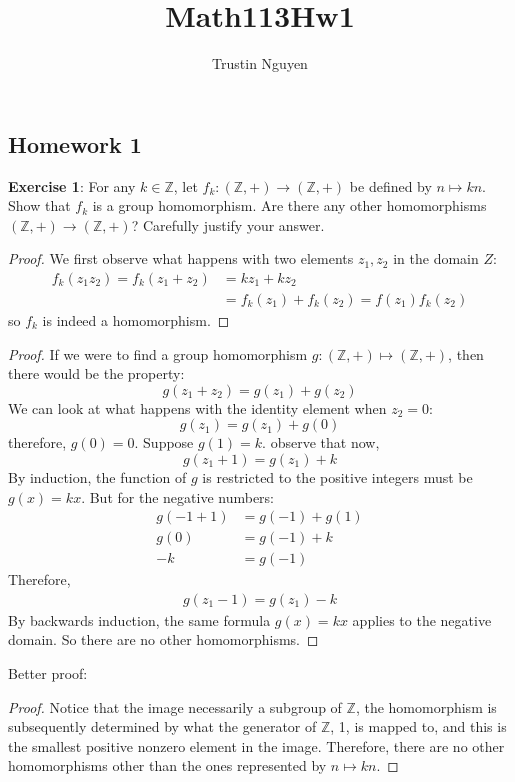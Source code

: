 \documentclass{article}
\title{Math113Hw1}
\author{Trustin Nguyen}
\begin{document}
\maketitle
\begin{topic}
	\section*{Homework 1}
\end{topic}
\reversemarginpar

\textbf{Exercise 1}: For any $k \in \mathbb{Z}$, let $f_{k} : (\mathbb{Z}, + ) \rightarrow (\mathbb{Z}, + )$ be defined by $n \mapsto kn$. Show that $f_{k}$ is a group homomorphism. Are there any other homomorphisms $(\mathbb{Z}, + ) \rightarrow (\mathbb{Z}, + )$? Carefully justify your answer.

\begin{proof}
	We first observe what happens with two elements $z_{1}, z_{2}$ in the domain $Z$:
	\begin{align*}
		f_{k}(z_{1}z_{2}) = f_{k}(z_{1} + z_{2}) &= kz_{1} + kz_{2} \\
							 &= f_{k}(z_{1}) + f_{k}(z_{2}) = f(z_{1})f_{k}(z_{2})
	\end{align*}
	so $f_{k}$ is indeed a homomorphism.
\end{proof}
\begin{proof}
	If we were to find a group homomorphism $g: (\mathbb{Z}, + ) \mapsto (\mathbb{Z}, + )$, then there would be the property:
	\begin{equation*}
		g(z_{1} + z_{2}) = g(z_{1}) + g(z_{2})
	\end{equation*}
	We can look at what happens with the identity element when $z_{2} = 0$:
	\begin{equation*}
		g(z_{1}) = g(z_{1}) + g(0)
	\end{equation*}
	therefore, $g(0) = 0$. Suppose $g(1) = k$. observe that now,
	\begin{equation*}
		g(z_{1} + 1) = g(z_{1}) + k
	\end{equation*}
	By induction, the function of $g$ is restricted to the positive integers must be $g(x) = kx$. But for the negative numbers:
	\begin{align*}
		g(-1 + 1) &= g(-1) + g(1) \\
		g(0) &= g(-1) + k \\
		-k &= g(-1)
	\end{align*}
	Therefore, 
	\begin{align*}
		g(z_{1} - 1) = g(z_{1}) - k
	\end{align*}
	By backwards induction, the same formula $g(x) = kx$ applies to the negative domain. So there are no other homomorphisms.
\end{proof}
Better proof: 
\begin{proof}
	Notice that the image necessarily a subgroup of $\mathbb{Z}$, the homomorphism is subsequently determined by what the generator of $\mathbb{Z}$, 1, is mapped to, and this is the smallest positive nonzero element in the image. Therefore, there are no other homomorphisms other than the ones represented by $n \mapsto kn$. 
\end{proof}
\end{document}
